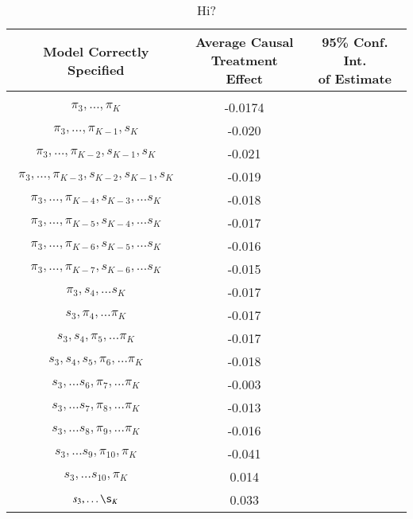 \begin{table}[h!]
\centering
\begin{tabular} {c | c  c}
Model Correctly Specified & \shortstack{Average Causal \\ Treatment Effect}  & \shortstack{95\% Conf. Int.\\ of Estimate} \\ 
\hline  \\
$\pi_3, \dots, \pi_K$ & -0.0174 & \\ 
$\pi_3, \dots, \pi_{K-1}, s_K$ & -0.020 & \\ 
$\pi_3, \dots, \pi_{K-2}, s_{K-1}, s_K$ & -0.021 & \\ 
$\pi_3, \dots, \pi_{K-3}, s_{K-2} , s_{K-1}, s_K$ & -0.019& \\ 
$\pi_3, \dots, \pi_{K-4}, s_{K-3}, \dots s_K $ & -0.018 & \\ 
$\pi_3, \dots, \pi_{K-5}, s_{K-4}, \dots s_K $ & -0.017 & \\ 
$\pi_3, \dots, \pi_{K-6}, s_{K-5}, \dots s_K $ & -0.016  & \\ 
$\pi_3, \dots, \pi_{K-7}, s_{K-6}, \dots s_K $ & -0.015& \\ 
$\pi_3, s_{4}, \dots s_K $ & -0.017 & \\ 
$s_3, \pi_4, \dots \pi_K$ & -0.017& \\ 
$s_3, s_4, \pi_5, \dots \pi_K$ & -0.017 & \\ 
$s_3, s_4, s_5, \pi_6, \dots \pi_K$ & -0.018 & \\ 
$s_3, \dots s_6, \pi_7, \dots \pi_K$ & -0.003& \\ 
$s_3, \dots s_7, \pi_8, \dots \pi_K$ & -0.013 & \\ 
$s_3, \dots s_8, \pi_9, \dots \pi_K$ & -0.016 & \\ 
$s_3, \dots s_9, \pi_{10}, \pi_K$ & -0.041& \\ 
$s_3, \dots s_10, \pi_K$ & 0.014 & \\
$s_3, \dots \s_K$ & 0.033 & \\ 
\end{tabular} \\
\centering
\caption{Hi?}
\end{table}
